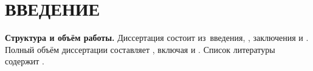 \chapter*{ВВЕДЕНИЕ}

\newcommand{\actuality}{\textbf{Актуальность темы.}\enspace\ignorespaces}
\newcommand{\aim}{\textbf{Цель работы.}\enspace\ignorespaces}
\newcommand{\tasks}{\textbf{Задачи работы.}\enspace\ignorespaces}
\newcommand{\novelty}{\textbf{Научная новизна.}\enspace\ignorespaces}
\newcommand{\influence}{\textbf{Теоретическая и практическая значимость.}\enspace\ignorespaces}
\newcommand{\methods}{\textbf{Методы и инструменты исследования.}\enspace\ignorespaces}
\newcommand{\defpositions}{\textbf{Основные положения, выносимые на защиту.}\enspace\ignorespaces}
\newcommand{\relevance}{\textbf{Соответствие специальность.}\enspace\ignorespaces}
\newcommand{\reliability}{\textbf{Достоверность результатов проведённых исследований.}\enspace\ignorespaces}
\newcommand{\probation}{\textbf{Апробация работы.}\enspace\ignorespaces}
\newcommand{\contribution}{\textbf{Личный вклад автора.}\enspace\ignorespaces}
\newcommand{\publications}{\textbf{Публикации по теме диссертации.}\enspace\ignorespaces}
\newcommand{\structure}{\textbf{Структура и объём работы.}\enspace\ignorespaces}



\structure
Диссертация состоит из~введения,
,
заключения и
.
Полный объём диссертации составляет
, включая
 и
.
Список литературы содержит
.
